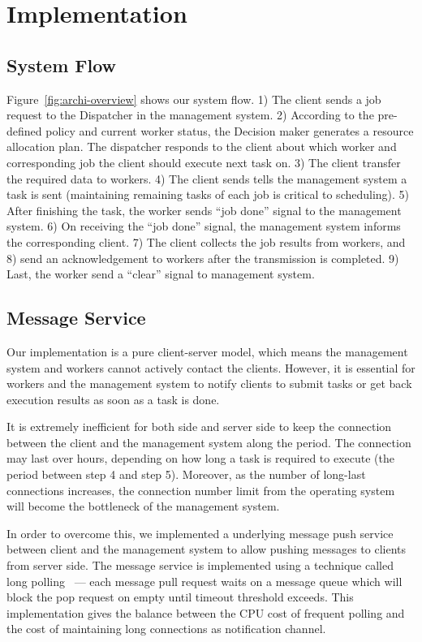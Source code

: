\section{Implementation}\label{sec:impl}  %

\subsection{System Flow}	%

Figure~\ref{fig:archi-overview} shows our system flow.
1) The client sends a job request to the Dispatcher in the management 
system.
2) According to the pre-defined policy and current worker status, the 
Decision maker generates a resource allocation plan.
The dispatcher responds to the client about which worker and
corresponding job the client should execute next task on.
3) The client transfer the required data to workers.
4) The client sends tells the management system a task is sent
(maintaining remaining tasks of each job is critical to scheduling).
5) After finishing the task, the worker sends ``job done'' signal to the
management system.
6) On receiving the ``job done'' signal,  the management system informs
the corresponding client.
7) The client collects the job results from workers, and
8) send an acknowledgement to workers after the transmission is 
completed.
9) Last, the worker send a ``clear'' signal to management system.

\subsection{Message Service} %

Our implementation is a pure client-server model, which means the
management system and workers cannot actively contact the clients.
However, it is essential for workers and the management system to notify
clients to submit tasks or get back execution results as soon as a task
is done.

It is extremely inefficient for both side and server side to keep the
connection between the client and the management system along the
period.
The connection may last over hours, depending on how long a task is
required to execute (the period between step 4 and step 5).
Moreover, as the number of long-last connections increases, the
connection number limit from the operating system will become the
bottleneck of the management system.

In order to overcome this, we implemented a underlying message push
service between client and the management system to allow pushing
messages to clients from server side.
The message service is implemented using a technique called long
polling~\cite{cite:push-pull} --- each message pull request waits on a
message queue which will block the pop request on empty until timeout
threshold exceeds.
This implementation gives the balance between the CPU cost of frequent
polling and the cost of maintaining long connections as notification
channel.

